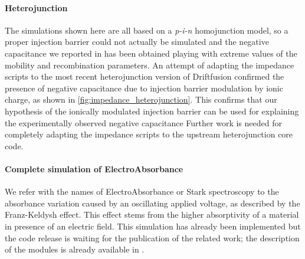 	\begin{figure}
	\end{figure}

	\paragraph{Heterojunction}
	The simulations shown here are all based on a \textit{p-i-n} homojunction model, so a proper injection barrier could not actually be simulated and the negative capacitance we reported in  has been obtained playing with extreme values of the mobility and recombination parameters.
	An attempt of adapting the impedance scripts to the most recent heterojunction version of Driftfusion confirmed the presence of negative capacitance due to injection barrier modulation by ionic charge, as shown in \cref{fig:impedance_heterojunction}.
	This confirms that our hypothesis of the ionically modulated injection barrier can be used for explaining the experimentally observed negative capacitance \cite{Guerrero2016,Moia2019,Ghahremanirad2017,Sanchez2014}
	Further work is needed for completely adapting the impedance scripts to the upstream heterojunction core code.

	\paragraph{Complete simulation of ElectroAbsorbance}
	We refer with the names of ElectroAbsorbance or Stark spectroscopy to the absorbance variation caused by an oscillating applied voltage, as described by the Franz\hyp{}Keldysh effect.
	This effect stems from the higher absorptivity of a material in presence of an electric field.
	This simulation has already been implemented but the code release is waiting for the publication of the related work; the description of the modules is already available in .

